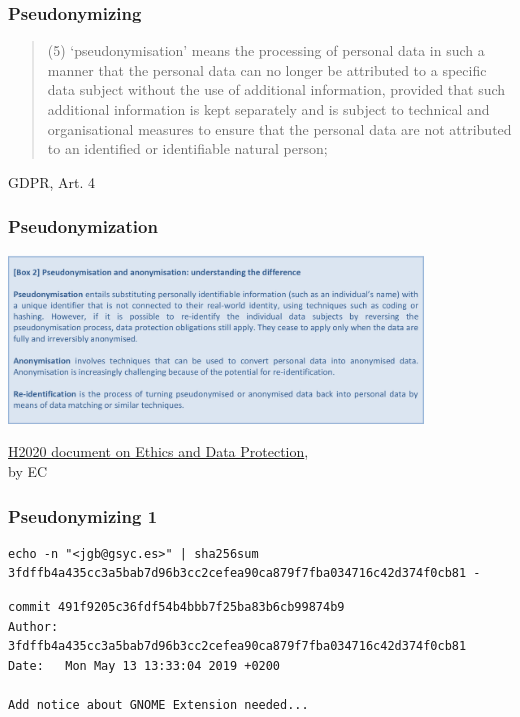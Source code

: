 \documentclass[17pt,aspectratio=169,hyperref={pdfusetitle,colorlinks,allcolors=olive}]{beamer}
\begin{document}
\begin{frame}[fragile]
  \frametitle{Pseudonymizing}

  {\footnotesize
  \begin{quotation}
    (5) ‘pseudonymisation’ means the processing of personal data in such a manner that the personal data can no longer be attributed to a specific data subject without the use of additional information, provided that such additional information is kept separately and is subject to technical and organisational measures to ensure that the personal data are not attributed to an identified or identifiable natural person;
  \end{quotation}
  }
  
  \begin{flushright}
    GDPR, Art. 4
  \end{flushright}
\end{frame}

\begin{frame}[fragile]
  \frametitle{Pseudonymization}

  \begin{center}
  \includegraphics[width=11cm]{figs/gdpr-pseudonymization}
  \end{center}  
  
  {\footnotesize
    \begin{flushright}
    \href{https://ec.europa.eu/research/participants/data/ref/h2020/grants_manual/hi/ethics/h2020_hi_ethics-data-protection_en.pdf}{H2020 document on Ethics and Data Protection}, \\ by EC
  \end{flushright}
  }
\end{frame}

\begin{frame}[fragile]
  \frametitle{Pseudonymizing 1}

{\small
\begin{verbatim}
echo -n "<jgb@gsyc.es>" | sha256sum 
3fdffb4a435cc3a5bab7d96b3cc2cefea90ca879f7fba034716c42d374f0cb81 -
\end{verbatim}
}  

{\small
\begin{verbatim}
commit 491f9205c36fdf54b4bbb7f25ba83b6cb99874b9
Author: 3fdffb4a435cc3a5bab7d96b3cc2cefea90ca879f7fba034716c42d374f0cb81
Date:   Mon May 13 13:33:04 2019 +0200

Add notice about GNOME Extension needed...
\end{verbatim}  
}

\end{frame}
\end{document}

